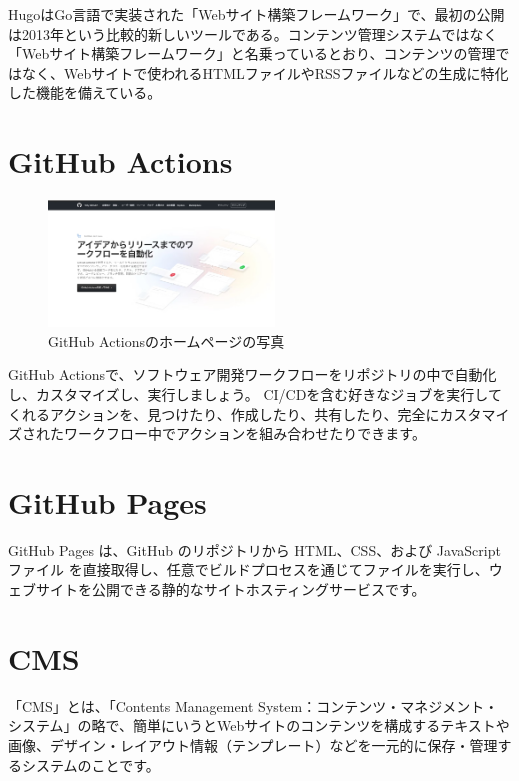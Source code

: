   \begin{tcolorbox}[title=Hugoとは]
    HugoはGo言語で実装された「Webサイト構築フレームワーク」で、最初の公開は2013年という比較的新しいツールである。コンテンツ管理システムではなく「Webサイト構築フレームワーク」と名乗っているとおり、コンテンツの管理ではなく、Webサイトで使われるHTMLファイルやRSSファイルなどの生成に特化した機能を備えている。
    \cite{hugoとは} \cite{hugo公式}
  \end{tcolorbox}

\section{GitHub Actions}

  \begin{figure}[H]
    \centering
    \includegraphics[width=6cm]{./image/02-chap3/githubActions.png}
    \caption{GitHub Actionsのホームページの写真}
    \label{chap3-githubAction-image}
  \end{figure}

  \begin{tcolorbox}[title=GitHub Pagesとは]
    GitHub Actionsで、ソフトウェア開発ワークフローをリポジトリの中で自動化し、カスタマイズし、実行しましょう。 CI/CDを含む好きなジョブを実行してくれるアクションを、見つけたり、作成したり、共有したり、完全にカスタマイズされたワークフロー中でアクションを組み合わせたりできます。
    \cite{githubAction}
  \end{tcolorbox}

\section{GitHub Pages}

  \begin{tcolorbox}[title=Hugoとは]
    GitHub Pages は、GitHub のリポジトリから HTML、CSS、および JavaScript ファイル を直接取得し、任意でビルドプロセスを通じてファイルを実行し、ウェブサイトを公開できる静的なサイトホスティングサービスです。
    \cite{githubPages}
  \end{tcolorbox}


\section{CMS}

  \begin{tcolorbox}[title=CMSとは]
    「CMS」とは、「Contents Management System：コンテンツ・マネジメント・システム」の略で、簡単にいうとWebサイトのコンテンツを構成するテキストや画像、デザイン・レイアウト情報（テンプレート）などを一元的に保存・管理するシステムのことです。
    \cite{cmsとは}
  \end{tcolorbox}

